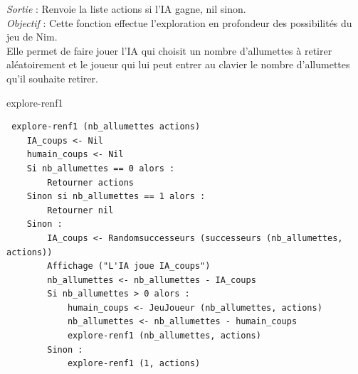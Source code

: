\documentclass[
]{article}
\begin{document}
\emph{Sortie} : Renvoie la liste actions si l'IA gagne, nil sinon.\\
\emph{Objectif} : Cette fonction effectue l'exploration en profondeur
des possibilités du jeu de Nim.\\
Elle permet de faire jouer l'IA qui choisit un nombre d'allumettes à
retirer aléatoirement et le joueur qui lui peut entrer au clavier le
nombre d'allumettes qu'il souhaite retirer.

\begin{algorithm}[H]
    \caption{explore-renf1}
\begin{verbatim}
 explore-renf1 (nb_allumettes actions)
    IA_coups <- Nil
    humain_coups <- Nil
    Si nb_allumettes == 0 alors :
        Retourner actions
    Sinon si nb_allumettes == 1 alors :
        Retourner nil
    Sinon :
        IA_coups <- Randomsuccesseurs (successeurs (nb_allumettes, actions))     
        Affichage ("L'IA joue IA_coups")
        nb_allumettes <- nb_allumettes - IA_coups
        Si nb_allumettes > 0 alors :
            humain_coups <- JeuJoueur (nb_allumettes, actions)
            nb_allumettes <- nb_allumettes - humain_coups
            explore-renf1 (nb_allumettes, actions)
        Sinon :
            explore-renf1 (1, actions)
\end{verbatim}
\end{algorithm}
\end{document}
